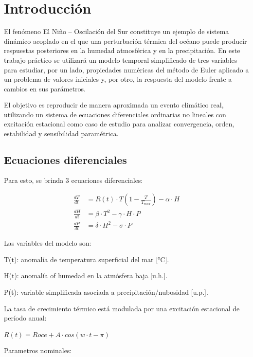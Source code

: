 \section{Introducción}

El fenómeno El Niño – Oscilación del Sur constituye un ejemplo de sistema dinámico acoplado en el que una perturbación térmica del océano puede producir respuestas posteriores en la humedad atmosférica y en la precipitación. En este trabajo práctico se utilizará un modelo temporal simplificado de tres variables para estudiar, por un lado, propiedades numéricas del método de Euler aplicado a un problema de valores iniciales y, por otro, la respuesta del modelo frente a cambios en sus parámetros.

El objetivo es reproducir de manera aproximada un evento climático real, utilizando un sistema de ecuaciones diferenciales ordinarias no lineales con excitación estacional como caso de estudio para analizar convergencia, orden, estabilidad y sensibilidad paramétrica.

\subsection{Ecuaciones diferenciales}

Para esto, se brinda 3 ecuaciones diferenciales:

\begin{equation}
\begin{aligned}
\frac{dT}{dt} &= R(t) \cdot T \left(1 - \frac{T}{T_{\max}}\right) - \alpha \cdot H \\
\frac{dH}{dt} &= \beta \cdot T^2 - \gamma \cdot H \cdot P \\
\frac{dP}{dt} &= \delta \cdot H^2 - \sigma \cdot P
\end{aligned}
\end{equation}

Las variables del modelo son:

T(t): anomalía de temperatura superficial del mar [°C]. 

H(t): anomalía of humedad en la atmósfera baja [u.h.]. 

P(t): variable simplificada asociada a precipitación/nubosidad [u.p.].

La tasa de crecimiento térmico está modulada por una excitación estacional de período anual:

$R(t) = Roce + A \cdot cos(w \cdot t - \pi)$

Parametros nominales:

